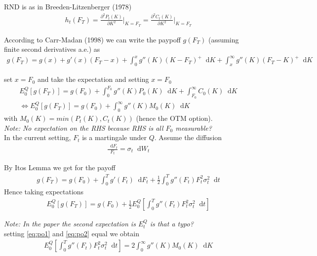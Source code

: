 \documentclass{article}
\newcommand*\diff{\mathop{}\!\mathrm{d}}
\begin{document}
RND is as in Breeden-Litzenberger (1978)
\begin{align*}
    h_{t}(F_{T}) = \frac{\partial^{2} P_{t}(K)}{\partial K^{2}} \big\rvert_{K = F_{T}} = \frac{\partial^{2} C_{t}(K)}{\partial K^{2}} \big\rvert_{K = F_{T}} 
\end{align*}

According to Carr-Madan (1998) we can write the paypoff $g(F_{T})$ (assuming finite second derivatives a.e.) as
\begin{align*}
g(F_{T}) = g(x) + g'(x)(F_{T} - x) + \int_{0}^{x} g''(K)(K - F_{T})^{+} \diff K + \int_{x}^{\infty} g''(K)(F_{T} - K)^{+} \diff K
\end{align*}

set $x = F_{0}$ and take the expectation and setting $x = F_{0}$
\begin{align}\label{eq:po1}
	E_{0}^{Q}[g(F_{T})] = g(F_{0}) + \int_{0}^{F_{0}} g''(K)P_{0}(K) \diff K + \int_{F_{0}}^{\infty} C_{0}(K)  \diff K\\
	\Leftrightarrow
    E_{0}^{Q}[g(F_{T})] = g(F_{0}) + \int_{0}^{\infty} g''(K)M_{0}(K) \diff K
\end{align}
with $M_{0}(K) = min(P_{t}(K), C_{t}(K))$ (hence the OTM option).\\

\textit{Note: No expectation on the RHS because RHS is all $F_{0}$ measurable?}\\

In the current setting, $F_{t}$ is a martingale under $Q$. Assume the diffusion
\begin{align}
    \frac{\diff F_ {t}}{F_{t}} = \sigma_{t} \diff W_{t}
\end{align}

By Itos Lemma we get for the payoff
\begin{align*}
    g(F_{T}) = g(F_{0}) + \int_{0}^{T} g'(F_{t}) \diff F_{t} + \frac{1}{2}\int_{0}^{T} g''(F_{t})F_{t}^{2} \sigma_{t}^{2} \diff t
\end{align*}
Hence taking expectations
\begin{align}\label{eq:po2}
    E_{0}^{Q}[g(F_{T})] = g(F_{0}) + \frac{1}{2} E_{0}^{Q} \left[ \int_{0}^{T} g''(F_{t}) F_{t}^{2} \sigma_{t}^{2} \diff t \right]
\end{align}

\textit{Note: In the paper the second expectation is $E_{t}^{Q}$ is that a typo?}\\

setting \ref{eq:po1} and \ref{eq:po2} equal we obtain
\begin{align}\label{eq:narela}
    E_{0}^{Q} \left[ \int_{0}^{T} g''(F_{t}) F_{t}^{2} \sigma_{t}^{2} \diff t \right] = 2 \int_{0}^{\infty} g''(K)M_{0}(K) \diff K
\end{align}
\end{document}
